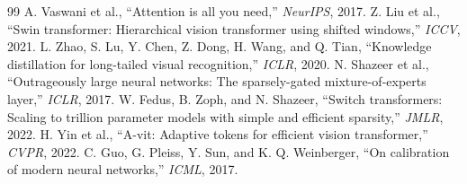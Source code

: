\documentclass[10pt,twocolumn,letterpaper]{article}
\begin{document}
\begin{thebibliography}{99}
 A. Vaswani et al., ``Attention is all you need,'' \textit{NeurIPS}, 2017.
 Z. Liu et al., ``Swin transformer: Hierarchical vision transformer using shifted windows,'' \textit{ICCV}, 2021.
 L. Zhao, S. Lu, Y. Chen, Z. Dong, H. Wang, and Q. Tian, ``Knowledge distillation for long-tailed visual recognition,'' \textit{ICLR}, 2020.
 N. Shazeer et al., ``Outrageously large neural networks: The sparsely-gated mixture-of-experts layer,'' \textit{ICLR}, 2017.
 W. Fedus, B. Zoph, and N. Shazeer, ``Switch transformers: Scaling to trillion parameter models with simple and efficient sparsity,'' \textit{JMLR}, 2022.
 H. Yin et al., ``A-vit: Adaptive tokens for efficient vision transformer,'' \textit{CVPR}, 2022.
 C. Guo, G. Pleiss, Y. Sun, and K. Q. Weinberger, ``On calibration of modern neural networks,'' \textit{ICML}, 2017.

\end{thebibliography}
\end{document}
